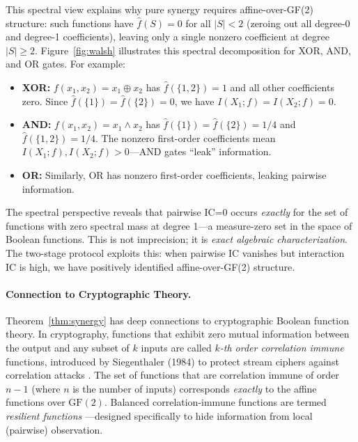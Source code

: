 \documentclass[10pt]{article} %
\theoremstyle{plain}
\theoremstyle{definition}
\begin{document}
\noindent This spectral view explains why pure synergy requires affine-over-GF(2) structure: such functions have $\hat{f}(S) = 0$ for all $|S| < 2$ (zeroing out all degree-0 and degree-1 coefficients), leaving only a single nonzero coefficient at degree $|S| \geq 2$. Figure~\ref{fig:walsh} illustrates this spectral decomposition for XOR, AND, and OR gates. For example:
\begin{itemize}
    \item \textbf{XOR:} $f(x_1, x_2) = x_1 \oplus x_2$ has $\hat{f}(\{1,2\}) = 1$ and all other coefficients zero. Since $\hat{f}(\{1\}) = \hat{f}(\{2\}) = 0$, we have $I(X_1; f) = I(X_2; f) = 0$.
    \item \textbf{AND:} $f(x_1, x_2) = x_1 \land x_2$ has $\hat{f}(\{1\}) = \hat{f}(\{2\}) = 1/4$ and $\hat{f}(\{1,2\}) = 1/4$. The nonzero first-order coefficients mean $I(X_1; f), I(X_2; f) > 0$---AND gates ``leak'' information.
    \item \textbf{OR:} Similarly, OR has nonzero first-order coefficients, leaking pairwise information.
\end{itemize}

\noindent The spectral perspective reveals that pairwise IC=0 occurs \emph{exactly} for the set of functions with zero spectral mass at degree 1---a measure-zero set in the space of Boolean functions. This is not imprecision; it is \emph{exact algebraic characterization}. The two-stage protocol exploits this: when pairwise IC vanishes but interaction IC is high, we have positively identified affine-over-GF(2) structure.

\paragraph{Connection to Cryptographic Theory.} Theorem~\ref{thm:synergy} has deep connections to cryptographic Boolean function theory. In cryptography, functions that exhibit zero mutual information between the output and any subset of $k$ inputs are called \emph{$k$-th order correlation immune} functions, introduced by Siegenthaler (1984) to protect stream ciphers against correlation attacks \citep{siegenthaler1984correlation}. The set of functions that are correlation immune of order $n-1$ (where $n$ is the number of inputs) corresponds \emph{exactly} to the affine functions over $\text{GF}(2)$. Balanced correlation-immune functions are termed \emph{resilient functions} \citep{chor1985resilient}---designed specifically to hide information from local (pairwise) observation.
\end{document}
